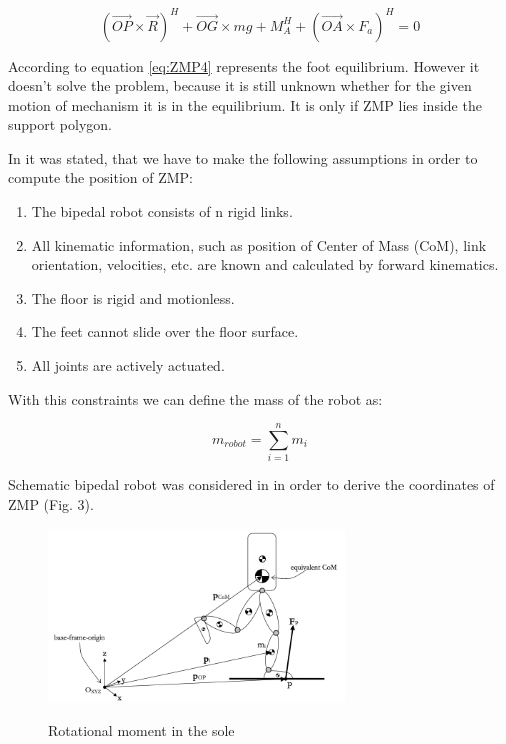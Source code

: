 \documentclass[12pt,a4paper]{report}
\begin{document}
		\begin{equation}\label{eq:ZMP4}
			(\vec{OP} \times \vec{R})^H + \vec{OG} \times mg + M_A^H + (\vec{OA} \times F_a)^H = 0
		\end{equation}

		According to \cite{vukobratovic2004zero} equation \ref{eq:ZMP4} represents the foot equilibrium. However it doesn't solve the problem, because it is still unknown whether for the given motion of mechanism it is in the equilibrium. It is only if ZMP lies inside the support polygon.
		
		In \cite{dekker2009zero} it was stated, that we have to make the following assumptions in order to compute the position of ZMP:

		\begin{enumerate}
			\item
				The bipedal robot consists of n rigid links.
			\item
				All kinematic information, such as position of Center of Mass (CoM), link orientation, velocities, etc. are known and calculated by forward kinematics.
			\item
				The floor is rigid and motionless.
			\item
				The feet cannot slide over the floor surface.
			\item
				All joints are actively actuated.
		\end{enumerate}
	
		With this constraints we can define the mass of the robot as:
	
		\begin{equation}\label{eq:ZMP5}
			m_{robot} = \sum^n_{i=1}{m_i}
		\end{equation}

		Schematic bipedal robot was considered in \cite{dekker2009zero} in order to derive the coordinates of ZMP (Fig. 3).

		\begin{figure}[h!]
			\vspace{-0.2cm}
			\centering
			{\includegraphics[width=0.7\textwidth]{3}}
			\caption{Rotational moment in the sole \cite{dekker2009zero}}
			\label{fig:3}
			\vspace{-0.1cm}
		\end{figure}
\end{document}
